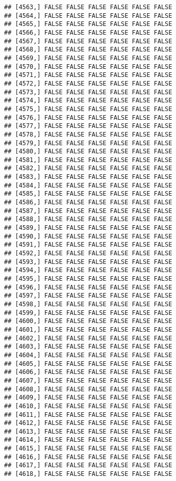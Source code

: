 \documentclass[
]{article}
\begin{document}
\begin{verbatim}
## [4563,] FALSE FALSE FALSE FALSE FALSE FALSE
## [4564,] FALSE FALSE FALSE FALSE FALSE FALSE
## [4565,] FALSE FALSE FALSE FALSE FALSE FALSE
## [4566,] FALSE FALSE FALSE FALSE FALSE FALSE
## [4567,] FALSE FALSE FALSE FALSE FALSE FALSE
## [4568,] FALSE FALSE FALSE FALSE FALSE FALSE
## [4569,] FALSE FALSE FALSE FALSE FALSE FALSE
## [4570,] FALSE FALSE FALSE FALSE FALSE FALSE
## [4571,] FALSE FALSE FALSE FALSE FALSE FALSE
## [4572,] FALSE FALSE FALSE FALSE FALSE FALSE
## [4573,] FALSE FALSE FALSE FALSE FALSE FALSE
## [4574,] FALSE FALSE FALSE FALSE FALSE FALSE
## [4575,] FALSE FALSE FALSE FALSE FALSE FALSE
## [4576,] FALSE FALSE FALSE FALSE FALSE FALSE
## [4577,] FALSE FALSE FALSE FALSE FALSE FALSE
## [4578,] FALSE FALSE FALSE FALSE FALSE FALSE
## [4579,] FALSE FALSE FALSE FALSE FALSE FALSE
## [4580,] FALSE FALSE FALSE FALSE FALSE FALSE
## [4581,] FALSE FALSE FALSE FALSE FALSE FALSE
## [4582,] FALSE FALSE FALSE FALSE FALSE FALSE
## [4583,] FALSE FALSE FALSE FALSE FALSE FALSE
## [4584,] FALSE FALSE FALSE FALSE FALSE FALSE
## [4585,] FALSE FALSE FALSE FALSE FALSE FALSE
## [4586,] FALSE FALSE FALSE FALSE FALSE FALSE
## [4587,] FALSE FALSE FALSE FALSE FALSE FALSE
## [4588,] FALSE FALSE FALSE FALSE FALSE FALSE
## [4589,] FALSE FALSE FALSE FALSE FALSE FALSE
## [4590,] FALSE FALSE FALSE FALSE FALSE FALSE
## [4591,] FALSE FALSE FALSE FALSE FALSE FALSE
## [4592,] FALSE FALSE FALSE FALSE FALSE FALSE
## [4593,] FALSE FALSE FALSE FALSE FALSE FALSE
## [4594,] FALSE FALSE FALSE FALSE FALSE FALSE
## [4595,] FALSE FALSE FALSE FALSE FALSE FALSE
## [4596,] FALSE FALSE FALSE FALSE FALSE FALSE
## [4597,] FALSE FALSE FALSE FALSE FALSE FALSE
## [4598,] FALSE FALSE FALSE FALSE FALSE FALSE
## [4599,] FALSE FALSE FALSE FALSE FALSE FALSE
## [4600,] FALSE FALSE FALSE FALSE FALSE FALSE
## [4601,] FALSE FALSE FALSE FALSE FALSE FALSE
## [4602,] FALSE FALSE FALSE FALSE FALSE FALSE
## [4603,] FALSE FALSE FALSE FALSE FALSE FALSE
## [4604,] FALSE FALSE FALSE FALSE FALSE FALSE
## [4605,] FALSE FALSE FALSE FALSE FALSE FALSE
## [4606,] FALSE FALSE FALSE FALSE FALSE FALSE
## [4607,] FALSE FALSE FALSE FALSE FALSE FALSE
## [4608,] FALSE FALSE FALSE FALSE FALSE FALSE
## [4609,] FALSE FALSE FALSE FALSE FALSE FALSE
## [4610,] FALSE FALSE FALSE FALSE FALSE FALSE
## [4611,] FALSE FALSE FALSE FALSE FALSE FALSE
## [4612,] FALSE FALSE FALSE FALSE FALSE FALSE
## [4613,] FALSE FALSE FALSE FALSE FALSE FALSE
## [4614,] FALSE FALSE FALSE FALSE FALSE FALSE
## [4615,] FALSE FALSE FALSE FALSE FALSE FALSE
## [4616,] FALSE FALSE FALSE FALSE FALSE FALSE
## [4617,] FALSE FALSE FALSE FALSE FALSE FALSE
## [4618,] FALSE FALSE FALSE FALSE FALSE FALSE

\end{verbatim}
\end{document}
